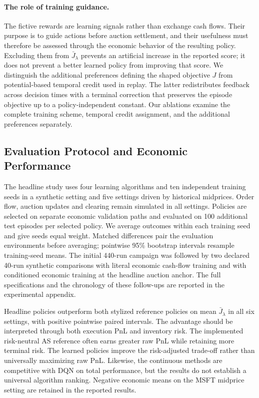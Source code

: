 \paragraph{The role of training guidance.}
The fictive rewards are learning signals rather than exchange cash flows.
Their purpose is to guide actions before auction settlement, and their usefulness
must therefore be assessed through the economic behavior of the resulting policy.
Excluding them from $\bar J_\lambda$ prevents an artificial increase in the
reported score; it does not prevent a better learned policy from improving that
score. We distinguish the additional preferences defining the shaped objective
$J$ from potential-based temporal credit used in replay. The latter redistributes
feedback across decision times with a terminal correction that preserves the
episode objective up to a policy-independent constant. Our ablations examine
the complete training scheme, temporal credit assignment, and the additional
preferences separately.

\subsection{Evaluation Protocol and Economic Performance}
\label{subsec:empirical_protocol}
The headline study uses four learning algorithms and ten independent training
seeds in a synthetic setting and five settings driven by historical midprices.
Order flow, auction updates and clearing remain simulated in all settings.
Policies are selected on separate economic validation paths and evaluated on
100 additional test episodes per selected policy. We average outcomes within
each training seed and give seeds equal weight. Matched differences pair the
evaluation environments before averaging; pointwise 95\% bootstrap intervals
resample training-seed means. The initial 440-run campaign was followed by two
declared 40-run synthetic comparisons with literal economic cash-flow training
and with conditioned economic training at the headline auction anchor.
The full specifications and the chronology of these follow-ups are reported
in the experimental appendix.

Headline policies outperform both stylized reference policies on mean
$\bar J_\lambda$ in all six settings, with positive pointwise paired intervals.
The advantage should be interpreted through both execution PnL and inventory
risk. The implemented risk-neutral AS reference often earns greater raw PnL
while retaining more terminal risk. The learned policies improve the risk-adjusted
trade-off rather than universally maximizing raw PnL. Likewise, the continuous
methods are competitive with DQN on total performance, but the results do not
establish a universal algorithm ranking. Negative economic means on the MSFT
midprice setting are retained in the reported results.

